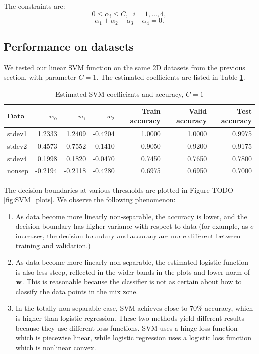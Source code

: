 The constraints are:
%
\begin{equation}
0 \leq \alpha_i \leq C,~~~i=1,\ldots ,4,
\end{equation}
\begin{equation}
\alpha_1 + \alpha_2 - \alpha_3 - \alpha_4 = 0.
\end{equation}

\subsection{Performance on datasets}

We tested our linear SVM function on the same 2D datasets from the previous section, with parameter $C = 1$.  The estimated coefficients are listed in Table \ref{tab:SVM_reg_coeff}.

\begin{table}[h!]
\centering
\caption{Estimated SVM coefficients and accuracy, $C = 1$ }
\begin{tabular}{lrrrrrr}
  \hline\hline
  Data   & $w_0$ 	& $w_1$ 	  & $w_2$ 	& Train accuracy & Valid accuracy & Test accuracy\\
  \hline
  stdev1 & 1.2333    &1.2409   & -0.4204         & 1.0000    &1.0000     & 0.9975\\
  stdev2 & 0.4573    & 0.7552   & -0.1410        & 0.9050    & 0.9200    & 0.9175\\
  stdev4 & 0.1998    & 0.1820   & -0.0470        & 0.7450    & 0.7650    & 0.7800\\
  nonsep &-0.2194   & -0.2118  & -0.4280        & 0.6975    & 0.6950    & 0.7000\\
  \hline\hline
\end{tabular}\label{tab:SVM_reg_coeff}
\end{table}

The decision boundaries at various thresholds are plotted in Figure TODO \ref{fig:SVM_plots}. We observe the following phenomenon:
\begin{enumerate}
\item As data become more linearly non-separable, the accuracy is lower, and the decision boundary has higher variance with respect to data (for example, as $\sigma$ increases, the decision boundary and accuracy are more different between training and validation.)
\item As data become more linearly non-separable, the estimated logistic function is also less steep, reflected in the wider bands in the plots and lower norm of $\boldsymbol{\mathbf{w}}$. This is reasonable because the classifier is not as certain about how to classify the data points in the mix zone.
\item In the totally non-separable case, SVM achieves close to 70\% accuracy, which is higher than logistic regression.  These two methods yield different results because they use different loss functions.  SVM uses a hinge loss function which is piecewise linear, while logistic regression uses a logistic loss function which is nonlinear convex.  
\end{enumerate}

